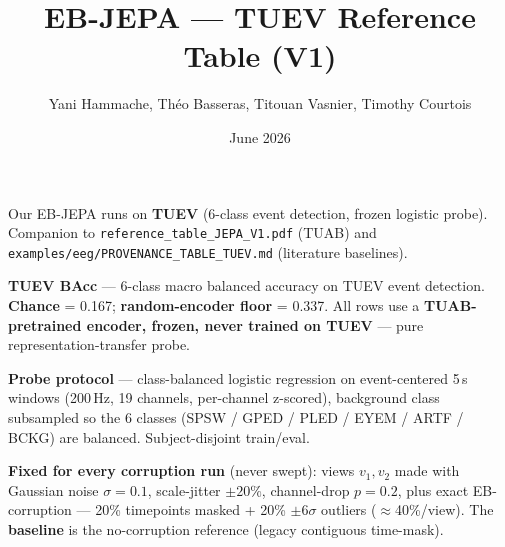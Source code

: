 \documentclass[10pt,a4paper]{article}
\title{\textbf{EB-JEPA --- TUEV Reference Table (V1)}}
\author{Yani Hammache, Théo Basseras, Titouan Vasnier, Timothy Courtois}
\date{June 2026}
\begin{document}
\maketitle

\noindent Our EB-JEPA runs on \textbf{TUEV} (6-class event detection, frozen logistic probe).
Companion to \texttt{reference\_table\_JEPA\_V1.pdf} (TUAB) and
\texttt{examples/eeg/PROVENANCE\_TABLE\_TUEV.md} (literature baselines).

\bigskip


\bigskip

\noindent\textbf{TUEV BAcc} --- 6-class macro balanced accuracy on TUEV event detection.
\textbf{Chance} = 0.167; \textbf{random-encoder floor} = 0.337. All rows use a
\textbf{TUAB-pretrained encoder, frozen, never trained on TUEV} --- pure
representation-transfer probe.

\medskip

\noindent\textbf{Probe protocol} --- class-balanced logistic regression on event-centered 5\,s
windows (200\,Hz, 19 channels, per-channel z-scored), background class subsampled so the 6 classes
(SPSW / GPED / PLED / EYEM / ARTF / BCKG) are balanced. Subject-disjoint train/eval.

\medskip

\noindent\textbf{Fixed for every corruption run} (never swept): views $v_1,v_2$ made with Gaussian
noise $\sigma=0.1$, scale-jitter $\pm20\%$, channel-drop $p=0.2$, plus exact EB-corruption ---
20\% timepoints masked + 20\% $\pm6\sigma$ outliers ($\approx$40\%/view). The \textbf{baseline} is
the no-corruption reference (legacy contiguous time-mask).

\medskip
\end{document}
